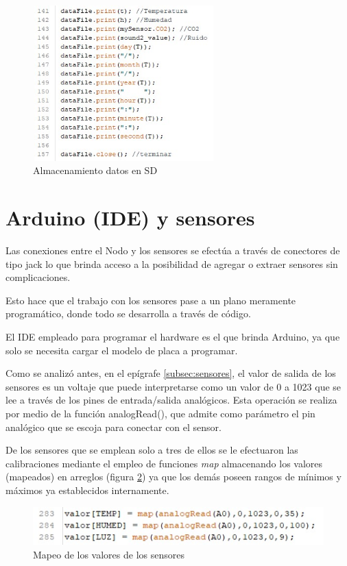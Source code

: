 \begin{figure}[H]
    \centering
    \includegraphics[width=7cm, height=6cm]{imagenes/codigo SD.jpg}
    \caption{Almacenamiento datos en SD}
    \label{imag:almacenamiento_SD}
\end{figure}

\section{Arduino (IDE) y sensores}

Las conexiones entre el Nodo y los sensores se efectúa a través de conectores de tipo jack lo que brinda acceso a la posibilidad de agregar o extraer sensores sin complicaciones.

Esto hace que el trabajo con los sensores pase a un plano meramente programático, donde todo se desarrolla a través de código.

El IDE empleado para programar el hardware es el que brinda Arduino, ya que solo se necesita cargar el modelo de placa a programar.

Como se analizó antes, en el epígrafe \ref{subsec:sensores}, el valor de salida de los sensores es un voltaje que puede interpretarse como un valor de 0 a 1023 que se lee a través de los pines de entrada/salida analógicos.
Esta operación se realiza por medio de la función analogRead(), que admite como parámetro el pin analógico que se escoja para conectar con el sensor.

De los sensores que se emplean solo a tres de ellos se le efectuaron las calibraciones mediante el empleo de funciones \textit{map} almacenando los valores (mapeados) en arreglos (figura \ref{imag:mapeo_sensores}) ya que los demás poseen rangos de mínimos y máximos ya establecidos internamente.

\begin{figure}[H]
    \centering
    \includegraphics{imagenes/mapeado.jpg}
    \caption{Mapeo de los valores de los sensores}
    \label{imag:mapeo_sensores}
\end{figure}

